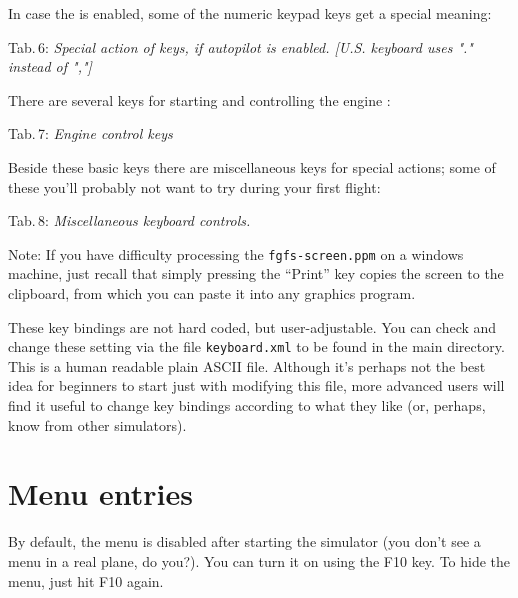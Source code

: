 In case the  is enabled, some of the numeric keypad keys get a
special
meaning:

\noindent
 Tab.\,6: \textit{Special action of keys, if autopilot is
 enabled. [U.S. keyboard uses "." instead of ","]}
\medskip

\centerline{}
\medskip

There are several keys for starting and controlling the engine :

\noindent
 Tab.\,7: \textit{Engine control keys}
\medskip

\centerline{}
\medskip

Beside these basic keys there are miscellaneous keys for special
actions; some of these you'll probably not want to try during your
first flight:
\vfill
\eject

\noindent Tab.\,8: \textit{Miscellaneous keyboard controls.}
\medskip

\centerline{}
\medskip

\noindent
 Note: If you have difficulty processing the 
\texttt{fgfs-screen.ppm}
on a windows machine, just recall that simply pressing the ``Print'' key copies
the
screen to the clipboard, from which you can paste it into any graphics program.

These key bindings are not hard coded, but
user-adjustable.
You can check and change these setting via the file
\texttt{keyboard.xml} to be found in the main
\FlightGear{} directory. This is a human readable plain ASCII file.
Although it's perhaps not the best idea for beginners to start just
with modifying this file, more advanced users will find it useful to
change key bindings according to what they like (or, perhaps, know from
other simulators).

\section{Menu entries}

By default, the menu is disabled after starting the simulator (you
don't see a menu in a real plane, do you?). You can turn it on using the F10
key. 
To hide the menu, just
hit F10 again.

